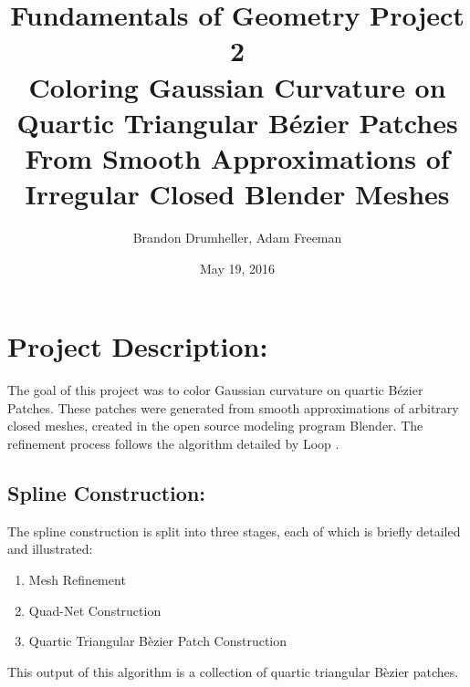 \documentclass[11pt]{article}
\title{{\bf Fundamentals of Geometry Project 2}\\Coloring Gaussian Curvature on Quartic Triangular B\'ezier Patches\\ From Smooth Approximations of Irregular Closed Blender Meshes\vspace{-0.25in}}
\author{Brandon Drumheller, Adam Freeman}
\date{\vspace{-0.25in}May 19, 2016}
\begin{document}
	\maketitle
	\section*{Project Description:}
	\vspace{-0.2in} 
	The goal of this project was to color Gaussian curvature on quartic B\'ezier Patches. These patches were generated from smooth approximations of arbitrary closed meshes, created in the open source modeling program Blender. The refinement process follows the algorithm detailed by Loop \cite{loop1994smooth}. 
	
	\subsection*{Spline Construction:}
	The spline construction is split into three stages, each of  which is briefly detailed and illustrated:
	\vspace{-0.1in}
	\begin{enumerate}
		\item Mesh Refinement
		\item Quad-Net Construction
		\item Quartic Triangular B\`ezier Patch Construction
	\end{enumerate}
	This output of this algorithm is a collection of quartic triangular B\`ezier patches.
	
\end{document}
